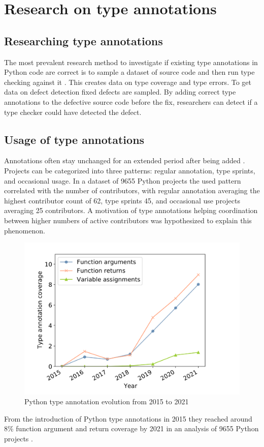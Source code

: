 \chapter{Research on type annotations\label{related_work}}
\section{Researching type annotations}

The most prevalent research method to investigate if existing type annotations in Python code are correct is to sample a dataset of source code and then run type checking against it \cite{di_grazia_evolution_2022, lin_towards_large_scale_2023, rak-amnouykit_taleoftwo_2020, xu_how_well_static_2023}. This creates data on type coverage and type errors. To get data on defect detection fixed defects are sampled. By adding correct type annotations to the defective source code before the fix, researchers can detect if a type checker could have detected the defect.


\section{Usage of type annotations}

Annotations often stay unchanged for an extended period after being added \cite{di_grazia_evolution_2022}. Projects can be categorized into three patterns: regular annotation, type sprints, and occasional usage. In a dataset of 9655 Python projects the used pattern correlated with the number of contributors, with regular annotation averaging the highest contributor count of 62, type sprints 45, and occasional use projects averaging 25 contributors. A motivation of type annotations helping coordination between higher numbers of active contributors was hypothesized to explain this phenomenon.

\begin{figure}
    \centering
    \includegraphics[width=0.5\linewidth]{Screenshot 2024-12-05 at 15.37.59.png}
    \caption{Python type annotation evolution from 2015 to 2021 \cite{di_grazia_evolution_2022}}
    \label{fig:annotation-evolution}
\end{figure}
From the introduction of Python type annotations in 2015 they reached around 8\% function argument and return coverage by 2021 in an analysis of 9655 Python projects \cite{di_grazia_evolution_2022}. 

